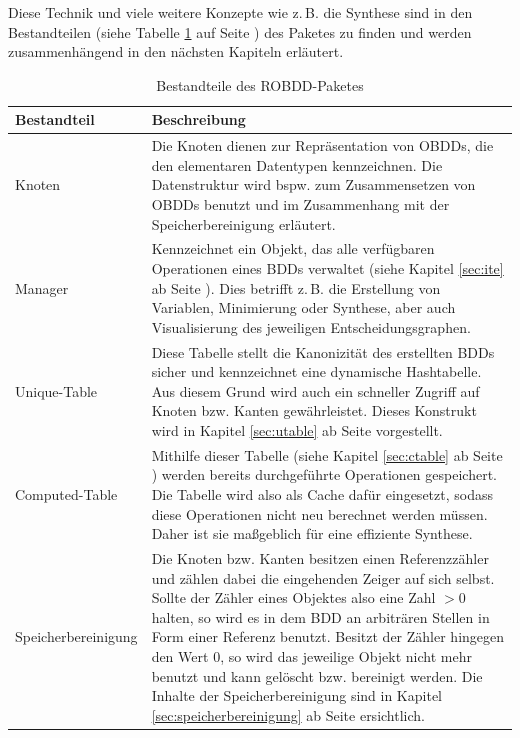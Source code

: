 Diese Technik und viele weitere Konzepte wie z.\,B. die Synthese sind in den Bestandteilen (siehe Tabelle \ref{tab:paket} auf Seite \pageref{tab:paket}) des Paketes zu finden und werden zusammenhängend in den nächsten Kapiteln erläutert.
\newpage
\begin{table}[bth]
	\centering
	\caption{Bestandteile des ROBDD-Paketes}
	\label{tab:paket}
	\begin{tabular}{ | l | p{10cm} | }
		\hline
		\textbf{Bestandteil} & \textbf{Beschreibung} \\ \hline
		Knoten & Die Knoten dienen zur Repräsentation von OBDDs, die den elementaren Datentypen kennzeichnen. Die Datenstruktur wird bspw. zum Zusammensetzen von OBDDs benutzt und im Zusammenhang mit der Speicherbereinigung erläutert.\\ \hline
		Manager & Kennzeichnet ein Objekt, das alle verfügbaren Operationen eines BDDs verwaltet (siehe Kapitel \ref{sec:ite} ab Seite \pageref{sec:ite}). Dies betrifft z.\,B. die Erstellung von Variablen, Minimierung oder Synthese, aber auch Visualisierung des jeweiligen Entscheidungsgraphen.\\ \hline
		Unique-Table & Diese Tabelle stellt die Kanonizität des erstellten BDDs sicher und kennzeichnet eine dynamische Hashtabelle. Aus diesem Grund wird auch ein schneller Zugriff auf Knoten bzw. Kanten gewährleistet. Dieses Konstrukt wird in Kapitel \ref{sec:utable} ab Seite \pageref{sec:utable} vorgestellt.\\ \hline
		Computed-Table & Mithilfe dieser Tabelle (siehe Kapitel \ref{sec:ctable} ab Seite \pageref{sec:ctable}) werden bereits durchgeführte Operationen gespeichert. Die Tabelle wird also als Cache dafür eingesetzt, sodass diese Operationen nicht neu berechnet werden müssen. Daher ist sie maßgeblich für eine effiziente Synthese.\\ \hline
		Speicherbereinigung & Die Knoten bzw. Kanten besitzen einen Referenzzähler und zählen dabei die eingehenden Zeiger auf sich selbst. Sollte der Zähler eines Objektes also eine Zahl $> 0$ halten, so wird es in dem BDD an arbiträren Stellen in Form einer Referenz benutzt. Besitzt der Zähler hingegen den Wert $0$, so wird das jeweilige Objekt nicht mehr benutzt und kann gelöscht bzw. bereinigt werden. Die Inhalte der Speicherbereinigung sind in Kapitel \ref{sec:speicherbereinigung} ab Seite \pageref{sec:speicherbereinigung} ersichtlich.\\ \hline
	\end{tabular}
\end{table}
